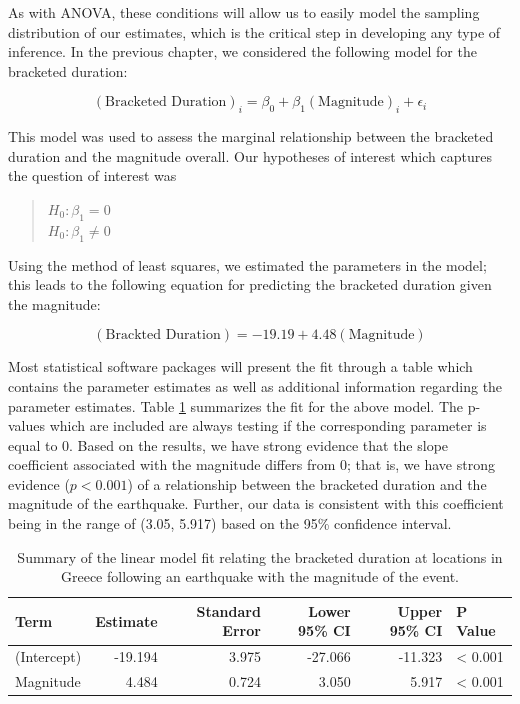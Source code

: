 \documentclass[]{book}
\theoremstyle{definition}
\theoremstyle{definition}
\theoremstyle{definition}
\theoremstyle{remark}
\begin{document}
As with ANOVA, these conditions will allow us to easily model the
sampling distribution of our estimates, which is the critical step in
developing any type of inference. In the previous chapter, we considered
the following model for the bracketed duration:

\[(\text{Bracketed Duration})_i = \beta_0 + \beta_1(\text{Magnitude})_i + \epsilon_i\]

This model was used to assess the marginal relationship between the
bracketed duration and the magnitude overall. Our hypotheses of interest
which captures the question of interest was

\begin{quote}
\(H_0: \beta_1 = 0\)\\
\(H_0: \beta_1 \neq 0\)
\end{quote}

Using the method of least squares, we estimated the parameters in the
model; this leads to the following equation for predicting the bracketed
duration given the magnitude:

\[(\text{Brackted Duration}) = -19.19 + 4.48(\text{Magnitude})\]

Most statistical software packages will present the fit through a table
which contains the parameter estimates as well as additional information
regarding the parameter estimates. Table
\ref{tab:regconditions-slr-summary} summarizes the fit for the above
model. The p-values which are included are always testing if the
corresponding parameter is equal to 0. Based on the results, we have
strong evidence that the slope coefficient associated with the magnitude
differs from 0; that is, we have strong evidence (\(p < 0.001\)) of a
relationship between the bracketed duration and the magnitude of the
earthquake. Further, our data is consistent with this coefficient being
in the range of (3.05, 5.917) based on the 95\% confidence interval.

\begin{table}

\caption{\label{tab:regconditions-slr-summary}Summary of the linear model fit relating the bracketed duration at locations in Greece following an earthquake with the magnitude of the event.}
\centering
\begin{tabular}[t]{l|r|r|r|r|l}
\hline
Term & Estimate & Standard Error & Lower 95\% CI & Upper 95\% CI & P Value\\
\hline
(Intercept) & -19.194 & 3.975 & -27.066 & -11.323 & < 0.001\\
\hline
Magnitude & 4.484 & 0.724 & 3.050 & 5.917 & < 0.001\\
\hline
\end{tabular}
\end{table}
\end{document}
